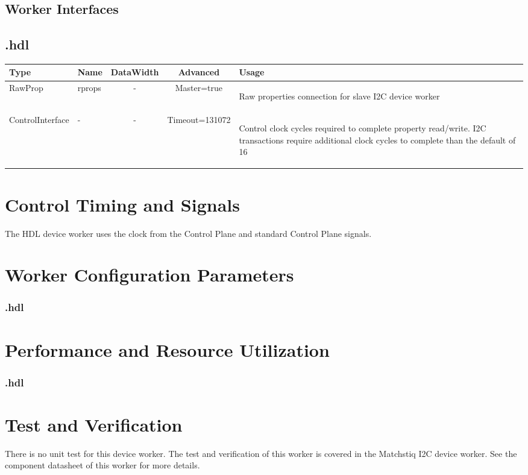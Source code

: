 \begin{landscape}
	\section*{Worker Interfaces}
	\subsection*{\comp.hdl}
	\begin{scriptsize}
		\begin{tabular}{|M{2cm}|M{1.5cm}|c|c|M{12cm}|}
			\hline
			Type & Name & DataWidth & Advanced & Usage \\
			\hline
			RawProp
			& rprops
			& -
			& Master=true
			& \begin{flushleft}Raw properties connection for slave I2C device worker\end{flushleft}\\
			\hline
			ControlInterface
			& -
			& -
			& Timeout=131072
			& \begin{flushleft}Control clock cycles required to complete property  read/write. I2C transactions require additional clock cycles to complete than the default of 16 \end{flushleft}\\
			\hline
		\end{tabular}
	\end{scriptsize}
\end{landscape}

\section*{Control Timing and Signals}
The \Comp{} HDL device worker uses the clock from the Control Plane and standard Control Plane signals.

\begin{landscape}
\section*{Worker Configuration Parameters}
\subsubsection*{\comp.hdl}
%
\section*{Performance and Resource Utilization}
\subsubsection*{\comp.hdl}
%
\end{landscape}

\section*{Test and Verification}
There is no unit test for this device worker. The test and verification of this worker is covered in the Matchstiq I2C device worker. See the component datasheet of this worker for more details.

